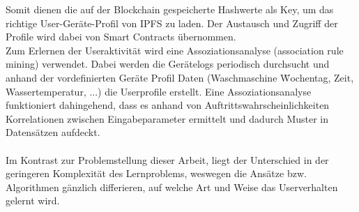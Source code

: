 Somit dienen die auf der Blockchain gespeicherte Hashwerte als Key, um das richtige User-Geräte-Profil von IPFS zu laden. Der Austausch und Zugriff der Profile wird dabei von Smart Contracts übernommen.\\
Zum Erlernen der Useraktivität wird eine Assoziationsanalyse (association rule mining) verwendet. Dabei werden die Gerätelogs periodisch durchsucht und anhand der vordefinierten Geräte Profil Daten (Waschmaschine \= Wochentag, Zeit, Wassertemperatur, ...) die Userprofile erstellt. Eine Assoziationsanalyse funktioniert dahingehend, dass es anhand von Auftrittswahrscheinlichkeiten Korrelationen zwischen Eingabeparameter ermittelt und dadurch Muster in Datensätzen aufdeckt\cite{Cios2007, online:associationrules}.\\\\
Im Kontrast zur Problemstellung dieser Arbeit, liegt der Unterschied in der geringeren Komplexität des Lernproblems, weswegen die Ansätze bzw. Algorithmen gänzlich differieren, auf welche Art und Weise das Userverhalten gelernt wird.